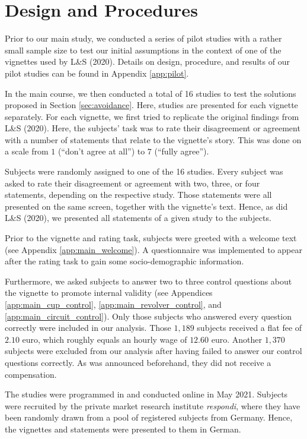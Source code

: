 \documentclass[egregdoesnotlikesansseriftitles,12pt]{scrartcl}
\begin{document}
\section{Design and Procedures}\label{sec:design}
Prior to our main study, we conducted a series of pilot studies with a rather small sample size to test our initial assumptions in the context of one of the vignettes used by L\&S (2020). Details on design, procedure, and results of our pilot studies can be found in Appendix \ref{app:pilot}.

In the main course, we then conducted a total of 16 studies to test the solutions proposed in Section \ref{sec:avoidance}. Here, studies are presented for each vignette separately. For each vignette, we first tried to replicate the original findings from L\&S (2020). Here, the subjects' task was to rate their disagreement or agreement with a number of statements that relate to the vignette's story. This was done on a scale from $1$ (``don't agree at all'') to $7$ (``fully agree'').

Subjects were randomly assigned to one of the 16 studies. Every subject was asked to rate their disagreement or agreement with two, three, or four statements, depending on the respective study. Those statements were all presented on the same screen, together with the vignette's text. Hence, as did L\&S (2020), we presented all statements of a given study to the subjects.

Prior to the vignette and rating task, subjects were greeted with a welcome text (see Appendix \ref{app:main_welcome}). A questionnaire was implemented to appear after the rating task to gain some socio-demographic information.

Furthermore, we asked subjects to answer two to three control questions about the vignette to promote internal validity (see Appendices \ref{app:main_cup_control}, \ref{app:main_revolver_control}, and \ref{app:main_circuit_control}). Only those subjects who answered every question correctly were included in our analysis. Those $1,189$ subjects received a flat fee of $2.10$ euro, which roughly equals an hourly wage of $12.60$ euro. Another $1,370$ subjects were excluded from our analysis after having failed to answer our control questions correctly. As was announced beforehand, they did not receive a compensation.

The studies were programmed in \citet{limesurvey_limesurvey_2021} and conducted online in May 2021. Subjects were recruited by the private market research institute \textit{respondi}, where they have been randomly drawn from a pool of registered subjects from Germany. Hence, the vignettes and statements were presented to them in German.
\end{document}

